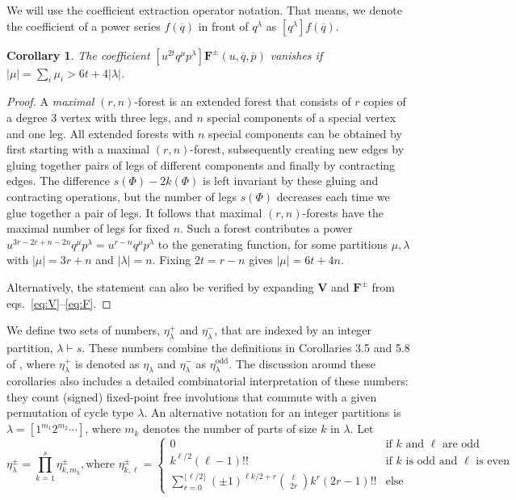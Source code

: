 \documentclass[oneside]{amsart}
\newtheorem{corollary}[theorem]{Corollary}
\theoremstyle{remark}
\newcommand{\bb}[1]{{\overline{#1}}}
\newcommand{\parts}{\vdash}
\begin{document}
We will use the coefficient extraction operator notation. That means, we denote the coefficient of a power series $f(\bb q)$ in front of $q^\lambda$ as $[q^\lambda] f(\bb q)$.
\begin{corollary}
\label{cor:coeffs}
The coefficient
$[u^{2t} q^\mu p^\lambda] \mathbf F^\pm(u,\bb q, \bb p)$ vanishes if 
$|\mu| = \sum_i \mu_i > 6t + 4 |\lambda|$.
\end{corollary}
\begin{proof}
A \emph{maximal} $(r,n)$-forest is an extended forest that consists of $r$ copies of a degree $3$ vertex with three legs, and $n$ special components 
of a special vertex and one leg.
All extended forests with $n$ special components can be obtained by first starting with a maximal $(r,n)$-forest, subsequently 
creating new edges by gluing together pairs of legs of different components and finally by contracting edges.
The difference $s(\Phi)-2k(\Phi)$ is left invariant by these gluing and contracting operations, but the number of legs $s(\Phi)$ decreases 
each time we glue together a pair of legs.
It follows that maximal $(r,n)$-forests have the maximal number of legs for fixed $n$.
Such a forest contributes a power $u^{3r-2r+n-2n} q^\mu p^\lambda= u^{r-n} q^\mu p^\lambda$ to the generating function,
for some partitions $\mu,\lambda$ with $|\mu| = 3r+n$ and $|\lambda| = n$.
Fixing $2t = r-n$ gives $|\mu| = 6t + 4n$. 

Alternatively, the statement can also be verified by expanding $\mathbf V$ and $\mathbf F^\pm$ from eqs.~\eqref{eq:V}--\eqref{eq:F}.
\end{proof}

We define two sets of numbers, $\eta_\lambda^+$ and $\eta^-_\lambda$, that are indexed by an integer partition, $\lambda \parts s$. These numbers combine the definitions in Corollaries 3.5 and 5.8 of \cite{BV2}, where $\eta^+_\lambda$ is denoted as $\eta_\lambda$ and $\eta^-_\lambda$ as $\eta^{\mathrm{odd}}_\lambda$.
The discussion around these corollaries also includes a detailed combinatorial interpretation of these numbers: they count (signed) fixed-point free involutions that commute with a given permutation of cycle type $\lambda$.
An alternative notation for an integer partitions is 
$\lambda = [1^{m_1} 2^{m_2} \cdots ]$, where $m_k$ denotes 
the number of parts of size $k$ in $\lambda$.
Let
$$
 \eta^\pm_{\lambda}  = \prod_{k = 1}^s \eta^\pm_{k, m_k}, \text{
 where }
%
%
%
%
%
%
%
%
%
%
%
%
%
%
%
%
\eta_{k,\ell}^\pm=
\begin{cases}
0 & \text{if $k$ and $\ell$ are odd}\\
k^{\ell/2} (\ell -1)!!  & \text{if $k$ is odd and $\ell$ is even}\\
\sum_{r=0}^{\lfloor \ell/2 \rfloor} (\pm 1)^{\ell k/2+r} \binom{\ell}{2r} k^r (2r-1)!! & \text{else}
\end{cases}
$$
\end{document}
